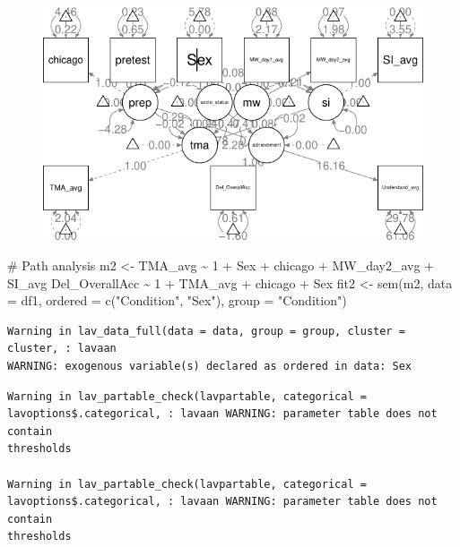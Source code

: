 \documentclass[
  letterpaper,
  DIV=11,
  numbers=noendperiod]{scrartcl}
\newenvironment{Shaded}{\begin{snugshade}}{\end{snugshade}}
\newcommand{\AttributeTok}[1]{\textcolor[rgb]{0.40,0.45,0.13}{#1}}
\newcommand{\CommentTok}[1]{\textcolor[rgb]{0.37,0.37,0.37}{#1}}
\newcommand{\FunctionTok}[1]{\textcolor[rgb]{0.28,0.35,0.67}{#1}}
\newcommand{\NormalTok}[1]{\textcolor[rgb]{0.00,0.23,0.31}{#1}}
\newcommand{\OtherTok}[1]{\textcolor[rgb]{0.00,0.23,0.31}{#1}}
\newcommand{\StringTok}[1]{\textcolor[rgb]{0.13,0.47,0.30}{#1}}
\begin{document}
\begin{figure}[H]

{\centering \includegraphics{modeling2_files/figure-pdf/unnamed-chunk-5-1.pdf}

}

\end{figure}

\begin{Shaded}
\begin{Highlighting}[]
\CommentTok{\# Path analysis}
\NormalTok{m2 }\OtherTok{\textless{}{-}} \StringTok{\textquotesingle{}}
\StringTok{  TMA\_avg \textasciitilde{} 1 + Sex + chicago + MW\_day2\_avg + SI\_avg}
\StringTok{  Del\_OverallAcc \textasciitilde{} 1 + TMA\_avg + chicago + Sex}
\StringTok{\textquotesingle{}}
\NormalTok{fit2 }\OtherTok{\textless{}{-}} \FunctionTok{sem}\NormalTok{(m2, }\AttributeTok{data =}\NormalTok{ df1,}
             \AttributeTok{ordered =} \FunctionTok{c}\NormalTok{(}\StringTok{"Condition"}\NormalTok{, }\StringTok{"Sex"}\NormalTok{), }\AttributeTok{group =} \StringTok{"Condition"}\NormalTok{)}
\end{Highlighting}
\end{Shaded}

\begin{verbatim}
Warning in lav_data_full(data = data, group = group, cluster = cluster, : lavaan
WARNING: exogenous variable(s) declared as ordered in data: Sex
\end{verbatim}

\begin{verbatim}
Warning in lav_partable_check(lavpartable, categorical =
lavoptions$.categorical, : lavaan WARNING: parameter table does not contain
thresholds

Warning in lav_partable_check(lavpartable, categorical =
lavoptions$.categorical, : lavaan WARNING: parameter table does not contain
thresholds
\end{verbatim}
\end{document}
